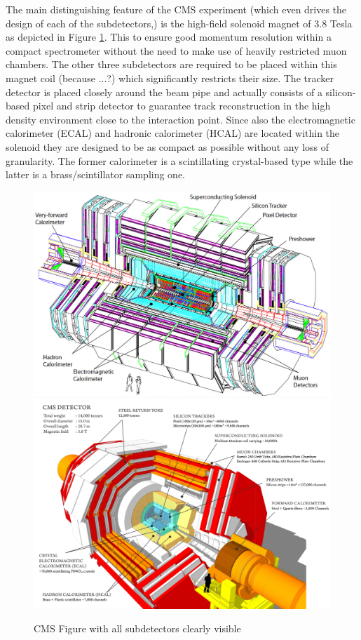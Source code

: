 The main distinguishing feature of the CMS experiment (which even drives the design of each of the subdetectors,) is the high-field solenoid magnet of $3.8$ Tesla as depicted in Figure \ref{fig::CMSFig}. This to ensure good momentum resolution within a compact spectrometer without the need to make use of heavily restricted muon chambers. The other three subdetectors are required to be placed within this magnet coil (because ...?) which significantly restricts their size. The tracker detector is placed closely around the beam pipe and actually consists of a silicon-based pixel and strip detector to guarantee track reconstruction in the high density environment close to the interaction point. Since also the electromagnetic calorimeter (ECAL) and hadronic calorimeter (HCAL) are located within the solenoid they are designed to be as compact as possible without any loss of granularity. The former calorimeter is a scintillating crystal-based type while the latter is a brass/scintillator sampling one.
\begin{figure}[h!t]
 \centering
 \includegraphics[width = 0.8 \textwidth]{Chapters/Chapter2_CERN/Figures/cms.png} \\ %
 \includegraphics[width = 0.8 \textwidth]{Chapters/Chapter2_CERN/Figures/cms_MuchText.png}%
 \caption{CMS Figure with all subdetectors clearly visible} \label{fig::CMSFig}
\end{figure}

